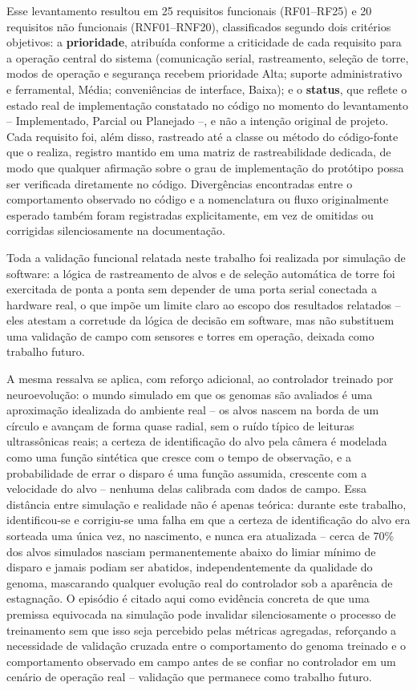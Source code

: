 \documentclass[12pt,a4paper]{article}
\begin{document}
Esse levantamento resultou em 25 requisitos funcionais (RF01--RF25) e 20 requisitos não
funcionais (RNF01--RNF20), classificados segundo dois critérios objetivos: a \textbf{prioridade},
atribuída conforme a criticidade de cada requisito para a operação central do sistema
(comunicação serial, rastreamento, seleção de torre, modos de operação e segurança recebem
prioridade Alta; suporte administrativo e ferramental, Média; conveniências de interface, Baixa);
e o \textbf{status}, que reflete o estado real de implementação constatado no código no momento do
levantamento -- Implementado, Parcial ou Planejado --, e não a intenção original de projeto. Cada
requisito foi, além disso, rastreado até a classe ou método do código-fonte que o realiza, registro
mantido em uma matriz de rastreabilidade dedicada, de modo que qualquer afirmação sobre o grau de
implementação do protótipo possa ser verificada diretamente no código. Divergências encontradas
entre o comportamento observado no código e a nomenclatura ou fluxo originalmente esperado também
foram registradas explicitamente, em vez de omitidas ou corrigidas silenciosamente na
documentação.

Toda a validação funcional relatada neste trabalho foi realizada por simulação de software: a
lógica de rastreamento de alvos e de seleção automática de torre foi exercitada de ponta a ponta
sem depender de uma porta serial conectada a hardware real, o que impõe um limite claro ao escopo
dos resultados relatados -- eles atestam a corretude da lógica de decisão em software, mas não
substituem uma validação de campo com sensores e torres em operação, deixada como trabalho futuro.

A mesma ressalva se aplica, com reforço adicional, ao controlador treinado por neuroevolução: o
mundo simulado em que os genomas são avaliados é uma aproximação
idealizada do ambiente real -- os alvos nascem na borda de um círculo e avançam de forma quase
radial, sem o ruído típico de leituras ultrassônicas reais; a certeza de identificação do alvo pela
câmera é modelada como uma função sintética que cresce com o tempo de observação, e a probabilidade
de errar o disparo é uma função assumida, crescente com a velocidade do alvo -- nenhuma delas
calibrada com dados de campo. Essa distância entre simulação e realidade não é apenas teórica:
durante este trabalho, identificou-se e
corrigiu-se uma falha em que a certeza de identificação do alvo era sorteada uma única vez, no
nascimento, e nunca era atualizada -- cerca de 70\% dos alvos simulados nasciam permanentemente
abaixo do limiar mínimo de disparo e jamais podiam ser abatidos, independentemente da qualidade do
genoma, mascarando qualquer evolução real do controlador sob a aparência de estagnação. O episódio
é citado aqui como evidência concreta de que uma premissa equivocada na simulação pode invalidar
silenciosamente o processo de treinamento sem que isso seja percebido pelas métricas agregadas,
reforçando a necessidade de validação cruzada entre o comportamento do genoma treinado e o
comportamento observado em campo antes de se confiar no controlador em um cenário de operação real
-- validação que permanece como trabalho futuro.
\end{document}
